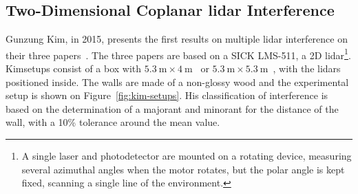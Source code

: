 \subsection{Two-Dimensional Coplanar \ac{lidar} Interference}
Gunzung Kim\etal, in 2015, presents the first results on multiple \ac{lidar} interference on their three papers~\cite{Kim2015a, Kim2015b, Kim2015c}. The three papers are based on a SICK LMS-511, a 2D \ac{lidar}\footnote{A single laser and photodetector are mounted on a rotating device, measuring several azimuthal angles when the motor rotates, but the polar angle is kept fixed, scanning a single line of the environment.}. Kim\etal setups consist of a box with $\SI{5.3}{\meter} \times \SI{4}{\meter}$~\cite{Kim2015a} or $\SI{5.3}{\meter} \times \SI{5.3}{\meter}$~\cite{Kim2015b, Kim2015c}, with the \acp{lidar} positioned inside. The walls are made of a non-glossy wood and the experimental setup is shown on Figure~\ref{fig:kim-setups}. His classification of interference is based on the determination of a majorant and minorant for the distance of the wall, with a 10\% tolerance around the mean value.

